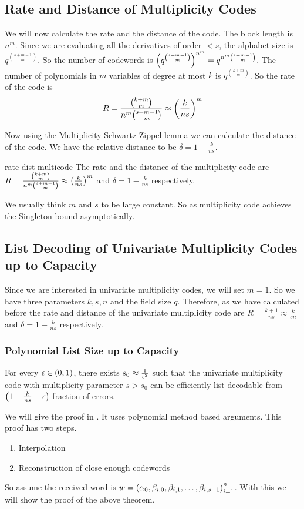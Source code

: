 \subsection{Rate and Distance of Multiplicity Codes}
We will now calculate the rate and the distance of the code. The block length is $n^m$. Since we are evaluating all the derivatives of order $<s$, the alphabet size is $q^{\binom{s+m-1}{m}}$. So the number of codewords is $\left(q^{\binom{s+m-1}{m}}\right)^{n^m}=q^{n^m\binom{s+m-1}{m}}$. The number of polynomials in $m$ variables of degree at most $k$ is $q^{\binom{k+m}{m}}$. So the rate of the code is $$R=\frac{\binom{k+m}{m}}{n^m\binom{s+m-1}{m}}\approx \left(\frac{k}{n s}\right)^m$$

Now using the Multiplicity Schwartz-Zippel lemma we can calculate the distance of the code. We have the relative distance to be $\delta=1-\frac{k}{ns}$. 

\begin{Theorem}{}{rate-dist-multicode}
The rate and the distance of the multiplicity code are $R=\frac{\binom{k+m}{m}}{n^m\binom{s+m-1}{m}}\approx \left(\frac{k}{n s}\right)^m$ and $\delta=1-\frac{k}{ns}$ respectively.
\end{Theorem}
We usually think $m$ and $s$ to be large constant. So as multiplicity code achieves the Singleton bound asymptotically.
\newpage

\subsection{List Decoding of Univariate Multiplicity Codes up to Capacity}
Since we are interested in univariate multiplicity codes, we will set $m=1$. So we have three parameters $k,s,n$ and the field size $q$. Therefore, as we have calculated before the rate and distance of the univariate multiplicity code are $R=\frac{k+1}{ns}\approx \frac{k}{sn}$ and $\delta=1-\frac{k}{ns}$ respectively. 
\subsubsection{Polynomial List Size up to Capacity}
\begin{Theorem}{\cite{Kopparty_2015_,GuruswamiWang_2011}}{}
For every $\epsilon\in(0,1)$, there exists $s_0\approx \frac1{\epsilon^2}$ such that the univariate multiplicity code with multiplicity parameter $s>s_0$ can be efficiently list decodable from $\left(1-\frac{k}{ns}-\epsilon\right)$ fraction of errors.
\end{Theorem}We will give the proof in \cite{GuruswamiWang_2011}. It uses polynomial method based arguments. This proof has two steps.\begin{enumerate}[label=Step \arabic*:, leftmargin=*]
    \item Interpolation
    \item Reconstruction of close enough codewords
\end{enumerate}So assume the received word is $w=\left(\alpha_0,\beta_{i,0},\beta_{i,1},\dots, \beta_{i,s-1}\right)_{i=1}^n$. With this we will show the proof of the above theorem. 

